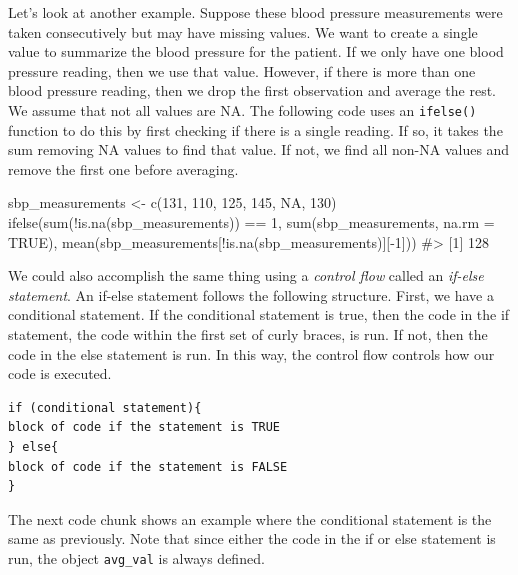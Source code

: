 \documentclass[
  letterpaper,
]{latex/krantz}
\makeatletter
\newenvironment{Shaded}{\begin{snugshade}}{\end{snugshade}}
\newcommand{\AttributeTok}[1]{\textcolor[rgb]{0.40,0.45,0.13}{#1}}
\newcommand{\CommentTok}[1]{\textcolor[rgb]{0.37,0.37,0.37}{#1}}
\newcommand{\ConstantTok}[1]{\textcolor[rgb]{0.56,0.35,0.01}{#1}}
\newcommand{\DecValTok}[1]{\textcolor[rgb]{0.68,0.00,0.00}{#1}}
\newcommand{\FunctionTok}[1]{\textcolor[rgb]{0.28,0.35,0.67}{#1}}
\newcommand{\NormalTok}[1]{\textcolor[rgb]{0.00,0.23,0.31}{#1}}
\newcommand{\OtherTok}[1]{\textcolor[rgb]{0.00,0.23,0.31}{#1}}
\newcommand{\SpecialCharTok}[1]{\textcolor[rgb]{0.37,0.37,0.37}{#1}}
\newenvironment{kframe}{%
\medskip{}
\setlength{\fboxsep}{.8em}
 \def\at@end@of@kframe{}%
 \ifinner\ifhmode%
  \def\at@end@of@kframe{\end{minipage}}%
  \begin{minipage}{\columnwidth}%
 \fi\fi%
 \def\FrameCommand##1{\hskip\@totalleftmargin \hskip-\fboxsep
 \colorbox{shadecolor}{##1}\hskip-\fboxsep
     \hskip-\linewidth \hskip-\@totalleftmargin \hskip\columnwidth}%
 \MakeFramed {\advance\hsize-\width
   \@totalleftmargin\z@ \linewidth\hsize
   \@setminipage}}%
 {\par\unskip\endMakeFramed%
 \at@end@of@kframe}
\renewenvironment{Shaded}{\begin{kframe}}{\end{kframe}}
\makeatother
\begin{document}
Let's look at another example. Suppose these blood pressure measurements
were taken consecutively but may have missing values. We want to create
a single value to summarize the blood pressure for the patient. If we
only have one blood pressure reading, then we use that value. However,
if there is more than one blood pressure reading, then we drop the first
observation and average the rest. We assume that not all values are NA.
The following code uses an \texttt{ifelse()} function to do this by
first checking if there is a single reading. If so, it takes the sum
removing NA values to find that value. If not, we find all non-NA values
and remove the first one before averaging.

\begin{Shaded}
\begin{Highlighting}[]
\NormalTok{sbp\_measurements }\OtherTok{\textless{}{-}} \FunctionTok{c}\NormalTok{(}\DecValTok{131}\NormalTok{, }\DecValTok{110}\NormalTok{, }\DecValTok{125}\NormalTok{, }\DecValTok{145}\NormalTok{, }\ConstantTok{NA}\NormalTok{, }\DecValTok{130}\NormalTok{)}
\FunctionTok{ifelse}\NormalTok{(}\FunctionTok{sum}\NormalTok{(}\SpecialCharTok{!}\FunctionTok{is.na}\NormalTok{(sbp\_measurements)) }\SpecialCharTok{==} \DecValTok{1}\NormalTok{, }
       \FunctionTok{sum}\NormalTok{(sbp\_measurements, }\AttributeTok{na.rm =} \ConstantTok{TRUE}\NormalTok{),}
       \FunctionTok{mean}\NormalTok{(sbp\_measurements[}\SpecialCharTok{!}\FunctionTok{is.na}\NormalTok{(sbp\_measurements)][}\SpecialCharTok{{-}}\DecValTok{1}\NormalTok{]))}
\CommentTok{\#\textgreater{} [1] 128}
\end{Highlighting}
\end{Shaded}

We could also accomplish the same thing using a \emph{control flow}
called an \emph{if-else statement}. An if-else
statement follows the following structure. First, we have a conditional
statement. If the conditional statement is true, then the code in the if
statement, the code within the first set of curly braces, is run. If
not, then the code in the else statement is run. In this way, the
control flow controls how our code is executed.

\begin{verbatim}
if (conditional statement){
block of code if the statement is TRUE
} else{
block of code if the statement is FALSE
}
\end{verbatim}

The next code chunk shows an example where the conditional statement is
the same as previously. Note that since either the code in the if or
else statement is run, the object \texttt{avg\_val} is always defined.
\end{document}
